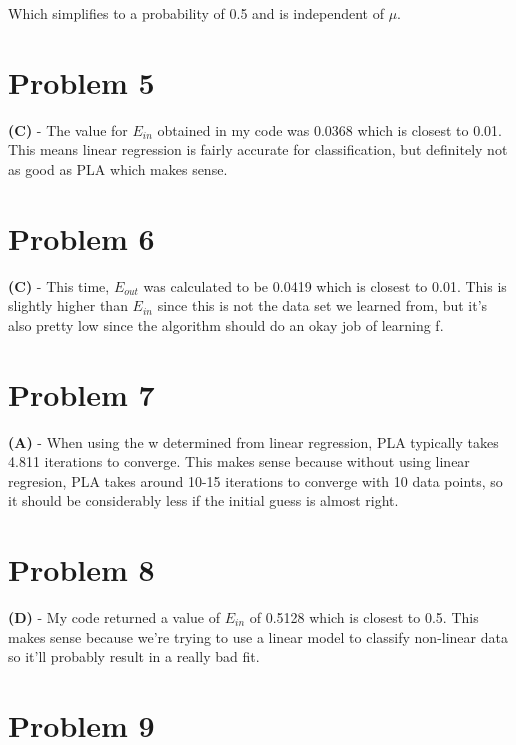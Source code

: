 \documentclass[10pt,letter]{article}
\begin{document}
\noindent Which simplifies to a probability of 0.5 and is independent of $\mu$.

\section*{Problem 5}

\textbf{(C)} - The value for $E_{in}$ obtained in my code was 0.0368 which is closest to 0.01. This means linear regression is fairly accurate for classification, but definitely not as good as PLA which makes sense.

\section*{Problem 6}


\textbf{(C)} - This time, $E_{out}$ was calculated to be 0.0419 which is closest to 0.01. This is slightly higher than $E_{in}$ since this is not the data set we learned from, but it's also pretty low since the algorithm should do an okay job of learning f.

\section*{Problem 7}

\textbf{(A)} - When using the w determined from linear regression, PLA typically takes 4.811 iterations to converge. This makes sense because without using linear regresion, PLA takes around 10-15 iterations to converge with 10 data points, so it should be considerably less if the initial guess is almost right.

\section*{Problem 8}

\textbf{(D)} - My code returned a value of $E_{in}$ of 0.5128 which is closest to 0.5. This makes sense because we're trying to use a linear model to classify non-linear data so it'll probably result in a really bad fit.

\section*{Problem 9}
\end{document}
